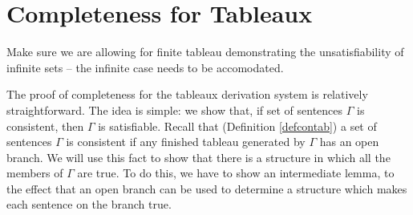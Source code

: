 

\section{Completeness for Tableaux}

Make sure we are allowing for finite tableau demonstrating the unsatisfiability of infinite sets – the infinite case needs to be accomodated.



The proof of completeness for the tableaux derivation system is relatively straightforward. The idea is simple: we show that, if set of sentences $\Gamma$ is consistent, then $\Gamma$ is satisfiable. Recall that (Definition \ref{defcontab}) a set of sentences $\Gamma$ is consistent if any finished tableau generated by $\Gamma$ has an open branch. We will use this fact to show that there is a structure in which all the members of $\Gamma$ are true. To do this, we have to show an intermediate lemma, to the effect that an open branch can be used to determine a structure which makes each sentence on the branch true.


